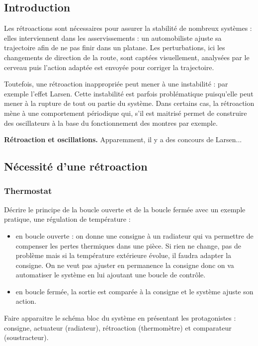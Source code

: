 \subsection*{Introduction}

Les rétroactions sont nécessaires pour assurer la stabilité de nombreux systèmes : elles interviennent dans les asservissements : un automobiliste ajuste sa trajectoire afin de ne pas finir dans un platane.
Les perturbations, ici les changements de direction de la route, sont captées visuellement, analysées par le cerveau puis l'action adaptée est envoyée pour corriger la trajectoire.

Toutefois, une rétroaction inappropriée peut mener à une instabilité : par exemple l'effet Larsen.
Cette instabilité est parfois problématique puisqu'elle peut mener à la rupture de tout ou partie du système.
Dans certains cas, la rétroaction mène à une comportement périodique qui, s'il est maitrisé permet de construire des oscillateurs à la base du fonctionnement des montres par exemple.

\begin{slide}
\textbf{Rétroaction et oscillations.}
Apparemment, il y a des concours de Larsen...
\end{slide}

\subsection{Nécessité d'une rétroaction}

\subsubsection{Thermostat}

Décrire le principe de la boucle ouverte et de la boucle fermée avec un exemple pratique, une régulation de température :
\begin{itemize}
\item en boucle ouverte : on donne une consigne à un radiateur qui va permettre de compenser les pertes thermiques dans une pièce.
Si rien ne change, pas de problème mais si la température extérieure évolue, il faudra adapter la consigne.
On ne veut pas ajuster en permanence la consigne donc on va automatiser le système en lui ajoutant une boucle de contrôle.
\item en boucle fermée, la sortie est comparée à la consigne et le système ajuste son action.
\end{itemize}
Faire apparaitre le schéma bloc du système en présentant les protagonistes : consigne, actuateur (radiateur), rétroaction (thermomètre) et comparateur (soustracteur).

